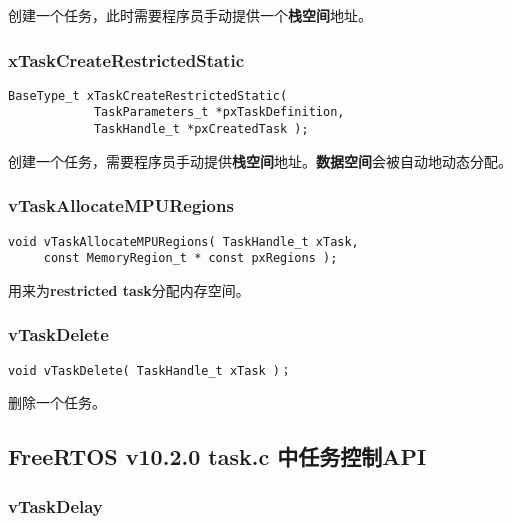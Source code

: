 \documentclass[12pt, a4paper]{article}
\begin{document}
创建一个任务，此时需要程序员手动提供一个\textbf{栈空间}地址。

\subsubsection {xTaskCreateRestrictedStatic}

\begin{lstlisting}[language={[ANSI]C},keywordstyle=\color{blue!70},commentstyle=\color{red!50!green!50!blue!50},frame=shadowbox, rulesepcolor=\color{red!20!green!20!blue!20}]
 BaseType_t xTaskCreateRestrictedStatic( 
 			TaskParameters_t *pxTaskDefinition, 
 			TaskHandle_t *pxCreatedTask );
\end{lstlisting}

创建一个任务，需要程序员手动提供\textbf{栈空间}地址。\textbf{数据空间}会被自动地动态分配。

\subsubsection {vTaskAllocateMPURegions}

\begin{lstlisting}[language={[ANSI]C},keywordstyle=\color{blue!70},commentstyle=\color{red!50!green!50!blue!50},frame=shadowbox, rulesepcolor=\color{red!20!green!20!blue!20}]
void vTaskAllocateMPURegions( TaskHandle_t xTask, 
	 const MemoryRegion_t * const pxRegions );
\end{lstlisting}

用来为\textbf{restricted task}分配内存空间。

\subsubsection {vTaskDelete}

\begin{lstlisting}[language={[ANSI]C},keywordstyle=\color{blue!70},commentstyle=\color{red!50!green!50!blue!50},frame=shadowbox, rulesepcolor=\color{red!20!green!20!blue!20}]
void vTaskDelete( TaskHandle_t xTask )；
\end{lstlisting}

删除一个任务。


\subsection {FreeRTOS v10.2.0 task.c 中任务控制API}

\subsubsection {vTaskDelay}
\end{document}

